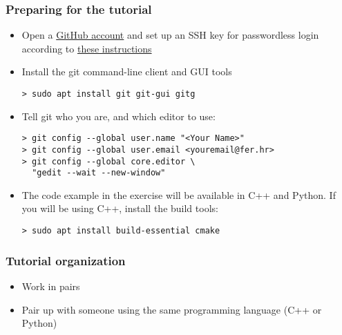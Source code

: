 \begin{frame}[fragile]

\frametitle{Preparing for the tutorial}
	
\begin{itemize}
	\item  Open a \href{https://github.com/join?source=header-home}{GitHub account} and set up an SSH key for passwordless login according to \href{https://help.github.com/articles/adding-a-new-ssh-key-to-your-github-account/}{these instructions}
	\item Install the git command-line client and GUI tools
	\begin{verbatim}
> sudo apt install git git-gui gitg
	\end{verbatim}
	\item Tell git who you are, and which editor to use:
	\begin{verbatim}
> git config --global user.name "<Your Name>"
> git config --global user.email <youremail@fer.hr>
> git config --global core.editor \
  "gedit --wait --new-window"
	\end{verbatim}
	\item The code example in the exercise will be available in C++ and Python. If you will be using C++, install the build tools:
	\begin{verbatim}
> sudo apt install build-essential cmake
	\end{verbatim}
\end{itemize}

\end{frame}


\begin{frame}

\frametitle{Tutorial organization}
	
\begin{itemize}
	\item Work in pairs
	\item Pair up with someone using the same programming language (C++ or Python)
\end{itemize}
	
\end{frame}

